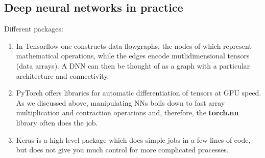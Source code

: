 \subsection{Deep neural networks in practice}
\label{subsec:dnnPractice}
Different packages:
\begin{enumerate} 
	\item In Tensorflow one constructs data flowgraphs, the nodes of which represent mathematical operations, while the edges encode mutlidimensional tensors (data arrays). A DNN can then be thought of as a graph with a particular architecture and connectivity.
	\item PyTorch offers libraries for automatic differentiation of tensors at GPU speed. As we discussed above, manipulating NNs boils down to fast array multiplication and contraction operations and, therefore, the \textbf{torch.nn} library often does the job.
	\item Keras is a high-level package which does simple jobs in a few lines of code, but does not give you much control for more complicated processes.
\end{enumerate}







